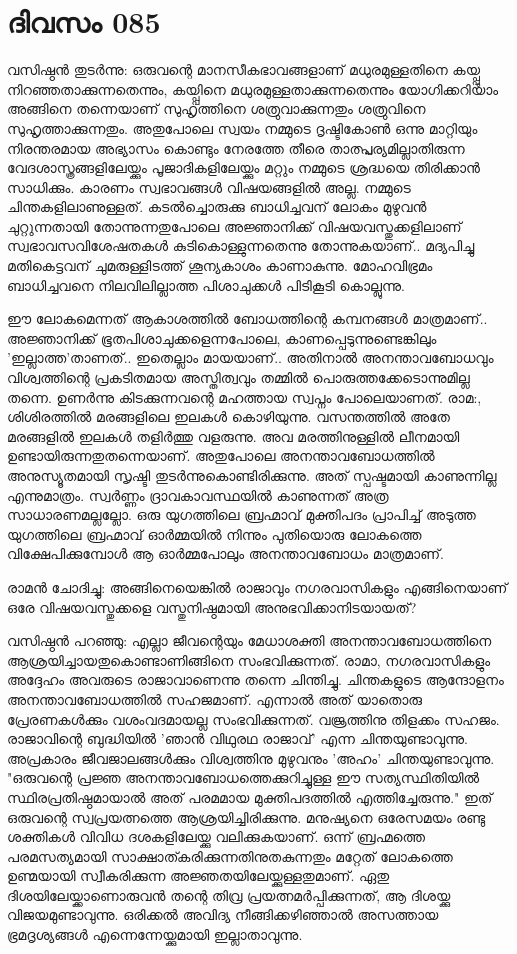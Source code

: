  
\section{ദിവസം 085}


വസിഷ്ഠന്‍ തുടര്‍ന്നു: ഒരുവന്റെ മാനസീകഭാവങ്ങളാണ്‌ മധുരമുള്ളതിനെ കയ്പ്പു നിറഞ്ഞതാക്കുന്നതെന്നും, കയ്പ്പിനെ മധുരമുള്ളതാക്കുന്നതെന്നും യോഗിക്കറിയാം അങ്ങിനെ തന്നെയാണ്‌ സുഹൃത്തിനെ ശത്രുവാക്കുന്നതും ശത്രുവിനെ സുഹൃത്താക്കുന്നതും. അതുപോലെ സ്വയം നമ്മുടെ ദൃഷ്ടികോണ്‍ ഒന്നു മാറ്റിയും നിരന്തരമായ അഭ്യാസം കൊണ്ടും നേരത്തേ തീരെ താത്പ്പര്യമില്ലാതിരുന്ന വേദശാസ്ത്രങ്ങളിലേയ്ക്കും പൂജാദികളിലേയ്ക്കും മറ്റും നമ്മുടെ ശ്രദ്ധയെ തിരിക്കാന്‍ സാധിക്കും. കാരണം സ്വഭാവങ്ങള്‍ വിഷയങ്ങളില്‍ അല്ല. നമ്മുടെ ചിന്തകളിലാണുള്ളത്‌. കടല്‍ച്ചൊരുക്കു ബാധിച്ചവന്‌ ലോകം മുഴുവന്‍ ചുറ്റുന്നതായി തോന്നുന്നതുപോലെ അജ്ഞാനിക്ക്‌ വിഷയവസ്തുക്കളിലാണ്‌ സ്വഭാവസവിശേഷതകള്‍ കുടികൊള്ളുന്നതെന്നു തോന്നുകയാണ്‌.. മദ്യപിച്ചു മതികെട്ടവന്‌ ചുമരുള്ളിടത്ത്‌ ശൂന്യകാശം കാണാകുന്നു. മോഹവിഭ്രമം ബാധിച്ചവനെ നിലവിലില്ലാത്ത പിശാചുക്കള്‍ പിടികൂടി കൊല്ലുന്നു.

ഈ ലോകമെന്നത്‌ ആകാശത്തില്‍ ബോധത്തിന്റെ കമ്പനങ്ങള്‍ മാത്രമാണ്‌.. അജ്ഞാനിക്ക്‌ ഭൂതപിശാചുക്കളെന്നപോലെ, കാണപ്പെടുന്നുണ്ടെങ്കിലും 'ഇല്ലാത്ത'താണത്‌..  ഇതെല്ലാം മായയാണ്‌.. അതിനാല്‍ അനന്താവബോധവും വിശ്വത്തിന്റെ പ്രകടിതമായ അസ്തിത്വവും തമ്മില്‍ പൊരുത്തക്കേടൊന്നുമില്ല തന്നെ. ഉണര്‍ന്നു കിടക്കുന്നവന്റെ മഹത്തായ സ്വപ്നം പോലെയാണത്‌. രാമ:, ശിശിരത്തില്‍ മരങ്ങളിലെ ഇലകള്‍ കൊഴിയുന്നു. വസന്തത്തില്‍ അതേ മരങ്ങളില്‍ ഇലകള്‍ തളിര്‍ത്തു വളരുന്നു. അവ മരത്തിനുള്ളില്‍ ലീനമായി ഉണ്ടായിരുന്നതുതന്നെയാണ്‌. അതുപോലെ അനന്താവബോധത്തില്‍ അനുസ്യൂതമായി സൃഷ്ടി തുടര്‍ന്നുകൊണ്ടിരിക്കുന്നു. അത്‌ സ്പഷ്ടമായി കാണുന്നില്ല എന്നുമാത്രം. സ്വര്‍ണ്ണം ദ്രാവകാവസ്ഥയില്‍ കാണുന്നത്‌ അത്ര സാധാരണമല്ലല്ലോ. ഒരു യുഗത്തിലെ ബ്രഹ്മാവ്‌ മുക്തിപദം പ്രാപിച്ച്‌ അടുത്ത യുഗത്തിലെ ബ്രഹ്മാവ്‌ ഓര്‍മ്മയില്‍ നിന്നും പുതിയൊരു ലോകത്തെ വിക്ഷേപിക്കുമ്പോള്‍ ആ ഓര്‍മ്മപോലും അനന്താവബോധം മാത്രമാണ്‌.

രാമന്‍ ചോദിച്ചു: അങ്ങിനെയെങ്കില്‍ രാജാവും നഗരവാസികളും എങ്ങിനെയാണ്‌ ഒരേ വിഷയവസ്തുക്കളെ വസ്തുനിഷ്ഠമായി അനുഭവിക്കാനിടയായത്‌? 

വസിഷ്ഠന്‍ പറഞ്ഞു: എല്ലാ ജീവന്റെയും മേധാശക്തി അനന്താവബോധത്തിനെ ആശ്രയിച്ചായതുകൊണ്ടാണിങ്ങിനെ സംഭവിക്കുന്നത്‌. രാമാ, നഗരവാസികളും അദ്ദേഹം അവരുടെ രാജാവാണെന്നു തന്നെ ചിന്തിച്ചു. ചിന്തകളുടെ ആന്ദോളനം അനന്താവബോധത്തില്‍ സഹജമാണ്‌. എന്നാല്‍ അത്‌ യാതൊരു പ്രേരണകള്‍ക്കും വശംവദമായല്ല സംഭവിക്കുന്നത്‌. വജ്രത്തിനു തിളക്കം സഹജം. രാജാവിന്റെ ബുദ്ധിയില്‍ 'ഞാന്‍ വിഥുരഥ രാജാവ്‌' എന്ന ചിന്തയുണ്ടാവുന്നു. അപ്രകാരം ജീവജാലങ്ങള്‍ക്കും വിശ്വത്തിനു മുഴുവനും 'അഹം' ചിന്തയുണ്ടാവുന്നു. "ഒരുവന്റെ പ്രജ്ഞ അനന്താവബോധത്തെക്കുറിച്ചുള്ള ഈ സത്യസ്ഥിതിയില്‍ സ്ഥിരപ്രതിഷ്ഠമായാല്‍ അത്‌ പരമമായ മുക്തിപദത്തില്‍ എത്തിച്ചേരുന്നു." ഇത്‌ ഒരുവന്റെ സ്വപ്രയത്നത്തെ ആശ്രയിച്ചിരിക്കുന്നു. മനുഷ്യനെ ഒരേസമയം രണ്ടു ശക്തികള്‍ വിവിധ ദശകളിലേയ്ക്കു വലിക്കുകയാണ്‌. ഒന്ന് ബ്രഹ്മത്തെ പരമസത്യമായി സാക്ഷാത്കരിക്കുന്നതിനുതകുന്നതും മറ്റേത്‌ ലോകത്തെ ഉണ്മയായി സ്വീകരിക്കുന്ന അജ്ഞതയിലേയ്ക്കുള്ളതുമാണ്‌. ഏതു ദിശയിലേയ്ക്കാണൊരുവന്‍ തന്റെ തിവ്ര പ്രയത്നമര്‍പ്പിക്കുന്നത്‌, ആ ദിശയ്ക്കു വിജയമുണ്ടാവുന്നു. ഒരിക്കല്‍ അവിദ്യ നീങ്ങിക്കഴിഞ്ഞാല്‍ അസത്തായ ഭ്രമദൃശ്യങ്ങള്‍ എന്നെന്നേയ്ക്കുമായി ഇല്ലാതാവുന്നു.
